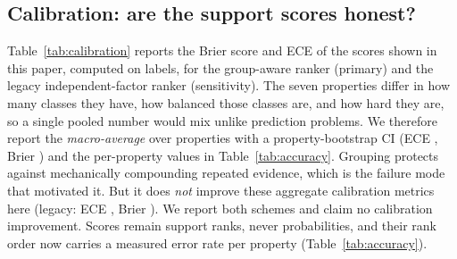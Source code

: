 \subsection{Calibration: are the support scores honest?}
\label{sec:calibration}
Table~\ref{tab:calibration} reports the Brier score and ECE of the scores shown in this
paper, computed on \benchname{} labels, for the group-aware ranker (primary) and the
legacy independent-factor ranker (sensitivity).  The seven properties differ in how
many classes they have, how balanced those classes are, and how hard they are, so a
single pooled number would mix unlike prediction problems.  We therefore report the
\emph{macro-average} over properties with a property-bootstrap CI (ECE \BenchECE{}
\BenchECEMacroCI{}, Brier \BenchBrier{} \BenchBrierMacroCI{}) and the per-property values
in Table~\ref{tab:accuracy}.  Grouping protects against mechanically compounding
repeated evidence, which is the failure mode that motivated it.  But it does \emph{not}
improve these aggregate calibration metrics here (legacy: ECE \BenchECELegacy{}
\BenchECEMacroLegacyCI{}, Brier \BenchBrierLegacy{} \BenchBrierMacroLegacyCI{}).  We
report both schemes and claim no calibration improvement.  Scores remain support ranks,
never probabilities, and their rank order now carries a measured error rate per
property (Table~\ref{tab:accuracy}).

\begin{table}[h]\centering\small
\caption{Calibration of the support scores on \benchname{} ground truth,
macro-averaged over the seven heterogeneous properties of Table~\ref{tab:accuracy}
(each weighted equally, since their class counts and difficulties differ; CIs by
bootstrap over properties).  Per-property values appear in Table~\ref{tab:accuracy}.}
\label{tab:calibration}

\end{table}
